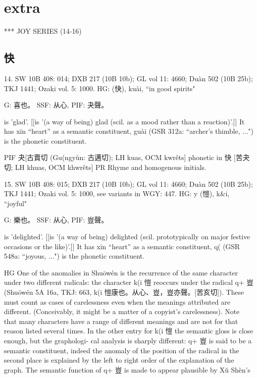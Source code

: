 \section{extra}
***
JOY SERIES (14-16)
\subsection{快}

14. SW 10B 408: 014; DXB 217 (10B 10b); GL vol 11: 4660; Duàn 502 (10B 25b); TKJ 1441; Ozaki vol. 5: 1000.
HG:            (快), kuài, ``in good spirits"

G:	喜也。
SSF: 从心,
PIF: 夬聲。

is 'glad'. [[is '(a way of being) glad (scil. as a mood rather than a reaction)'.]]
It has xīn ``heart'' as a semantic constituent,
guài (GSR 312a: ``archer's thimble, ...") is the phonetic constituent.

PIF     夬[古賣切 (Gu(ngyùn: 古邁切); LH kuas, OCM kwrêts] phonetic in 快 [苦夬切; LH khuas, OCM khwrêts]
PR	Rhyme and homogenous initials.


15. SW 10B 408: 015; DXB 217 (10B 10b); GL vol 11: 4660; Duàn 502 (10B 25b); TKJ 1441; Ozaki vol. 5: 1000, see
variants in WGY: 447.
HG: y (愷), k&i, ``joyful"

G:	樂也。
SSF: 从心,
PIF: 豈聲。

is 'delighted'. [[is '(a way of being) delighted (scil. prototypically on major festive occasions or the like)'.]]
It has xīn ``heart'' as a semantic constituent,
q( (GSR 548a: ``joyous, ...") is the phonetic constituent.

HG One of the anomalies in Shuōwén is the recurrence of the same character under two different radicals: the character k(i 愷 reoccurs under the radical q+ 豈 (Shuōwén 5A 16a, TKJ: 663, k(i 愷康也。从心、豈，豈亦聲。[苦亥切]). These must count as cases of carelessness even when the meanings attributed are different. (Conceivably, it might be a matter of a copyist's carelessness). Note that many characters have a range of different meanings and are not for that reason listed several times. In the other entry for k(i 愷 the semantic gloss is close enough, but the graphologi- cal analysis is sharply different: q+ 豈 is said to be a semantic constituent, indeed the anomaly of the position of the radical in the second place is explained by the left to right order of the explanation of the graph. The semantic function of q+ 豈 is made to appear plausible by Xǔ Shèn's



